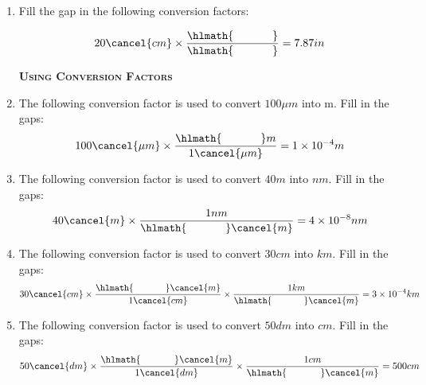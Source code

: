 \documentclass[main.tex]{subfiles}
\begin{document}
\begin{multicols*}{2}
\begin{enumerate}
\item Fill the gap in the following conversion factors:
\begin{center}\[ 20\cancel{cm} \times \dfrac{\hlmath{\hspace{35pt}}}{\hlmath{\hspace{35pt}}}=7.87in\]\end{center}
\begin{enumerate}[label=(\alph*)]
\end{enumerate}




\vspace{0.5cm}
{\raggedright\textsc{\textbf{Using Conversion Factors }}\par}


\item The following conversion factor is used to convert $100\mu m$ into m. Fill in the gaps:
\[100\cancel{\mu m} \times \dfrac{\hlmath{\hspace{35pt}}m}{1\cancel{\mu m}}=1\times 10^{-4}m\]

\item The following conversion factor is used to convert $40 m$ into $nm$. Fill in the gaps:
\[40\cancel{ m} \times \dfrac{  1   nm}{\hlmath{\hspace{35pt}} \cancel{ m}}=4\times 10^{-8}nm\]
\item The following conversion factor is used to convert $30 cm$ into $km$. Fill in the gaps:
\[30\cancel{cm} \times \dfrac{  \hlmath{\hspace{35pt}}\cancel{m}}{1\cancel{cm}}   \times \dfrac{1km}{ \hlmath{\hspace{35pt}}\cancel{m}}       =3\times 10^{-4}km\]
\item The following conversion factor is used to convert $50 dm$ into $cm$. Fill in the gaps:
\[50\cancel{dm} \times \dfrac{ \hlmath{\hspace{35pt}} \cancel{m}}{1\cancel{dm}}   \times \dfrac{1cm}{\hlmath{\hspace{35pt}}\cancel{m}}       = 500cm\]


\end{enumerate}
\end{multicols*}
\end{document}
